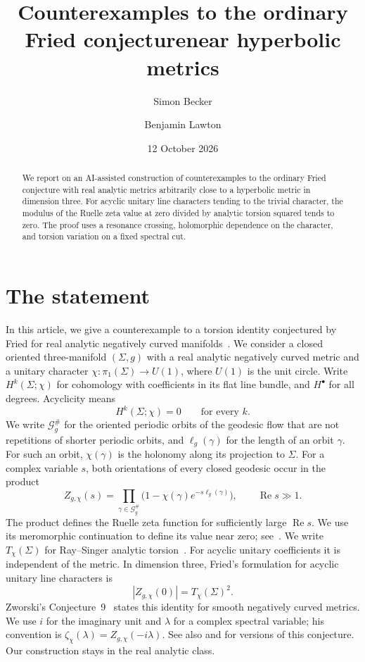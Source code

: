 \documentclass[11pt,letterpaper,reqno]{amsart}
\title[Counterexamples to the ordinary Fried conjecture]
{Counterexamples to the ordinary Fried conjecture\newline near hyperbolic metrics}
\author{Simon Becker}
\author{Benjamin Lawton}
\date{12 October 2026}
\theoremstyle{remark}
\begin{document}
\begin{abstract}
We report on an AI-assisted construction of counterexamples to the ordinary Fried conjecture
with real analytic metrics arbitrarily close to a hyperbolic
metric in dimension three. For acyclic unitary
line characters tending to the trivial character, the modulus of
the Ruelle zeta value at zero divided by analytic torsion squared
tends to zero. The proof
uses a resonance crossing, holomorphic dependence on the character, and
torsion variation on a fixed spectral cut.
\end{abstract}
\maketitle
\section{The statement}
In this article, we give a counterexample to a torsion identity conjectured by Fried for real analytic negatively
curved manifolds~\cite[pp.~180--181]{Fried95}.
We consider a closed oriented three-manifold $(\Sigma,g)$ with a real
analytic negatively curved metric and a unitary character
$\chi:\pi_1(\Sigma)\to U(1)$, where $U(1)$ is the unit circle.
Write $H^k(\Sigma;\chi)$ for cohomology with coefficients in its flat
line bundle, and $H^\bullet$ for all degrees. Acyclicity means
\[
 H^k(\Sigma;\chi)=0\qquad\text{for every }k.
\]
We write $\mathcal G_g^\#$ for the
oriented periodic orbits of the geodesic flow that are not repetitions
of shorter periodic orbits, and
$\ell_g(\gamma)$ for the length of an orbit $\gamma$.
For such an orbit, $\chi(\gamma)$ is the holonomy along its projection
to $\Sigma$.
For a complex variable $s$, both orientations of every closed geodesic
occur in the product
\begin{equation}\label{Euler}
 Z_{g,\chi}(s)=\prod_{\gamma\in\mathcal G_g^\#}
       \bigl(1-\chi(\gamma)e^{-s\ell_g(\gamma)}\bigr),
 \qquad \operatorname{Re}s\gg1.
\end{equation}
The product defines the Ruelle zeta function for sufficiently large
$\operatorname{Re}s$. We use its meromorphic continuation to define its
value near zero; see~\cite{DGRS}.
We write $T_\chi(\Sigma)$ for Ray--Singer analytic torsion~\cite{RS}.
For acyclic unitary coefficients it is independent of the metric.
In dimension three, Fried's formulation for acyclic unitary line
characters is
\begin{equation}\label{Friedidentity}
 |Z_{g,\chi}(0)|=T_\chi(\Sigma)^2.
\end{equation}
Zworski's Conjecture~9~\cite{Zw} states this identity for smooth
negatively curved metrics. We use $i$ for the imaginary unit and
$\lambda$ for a complex spectral variable; his convention is
$\zeta_\chi(\lambda)=Z_{g,\chi}(-i\lambda)$.
See also \cite[Conjecture~21, (35)]{HKS} and
\cite[Introduction, (1.2)]{DGRS} for versions of this conjecture.
Our construction stays in the real analytic class.
\end{document}
